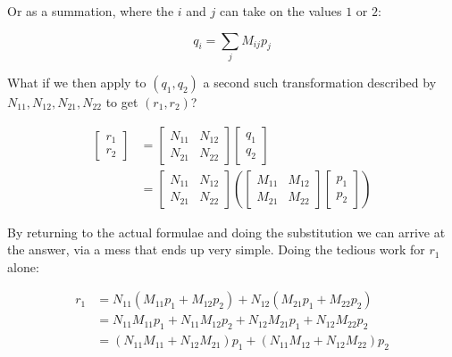 Or as a summation, where the $i$ and $j$ can take on the values $1$ or $2$:

\begin{equation}
q_i = \sum_{j} M_{ij} p_j
\label{eqn:matrix-multiplication-summation}
\end{equation}

What if we then apply to $(q_1, q_2)$ a second such transformation described by $N_{11}, N_{12}, N_{21}, N_{22}$ to get $(r_1, r_2)$? 

\begin{equation}
\begin{split}
\begin{bmatrix}
r_1 \\
r_2
\end{bmatrix}
&=
\begin{bmatrix}
N_{11} & N_{12} \\
N_{21} & N_{22}
\end{bmatrix}
\begin{bmatrix}
q_1 \\
q_2
\end{bmatrix} \\
&= 
\begin{bmatrix}
N_{11} & N_{12} \\
N_{21} & N_{22}
\end{bmatrix}
\left(
\begin{bmatrix}
M_{11} & M_{12} \\
M_{21} & M_{22}
\end{bmatrix}
\begin{bmatrix}
p_1 \\
p_2
\end{bmatrix}
\right)
\end{split}
\label{eqn:matrix-bracketing}
\end{equation}

By returning to the actual formulae and doing the substitution we can arrive at the answer, via a mess that ends up very simple. Doing the tedious work for $r_1$ alone:

\begin{equation}
\begin{split}
r_1 &= N_{11}(M_{11}p_1 + M_{12}p_2) + N_{12}(M_{21}p_1 + M_{22}p_2)  \\
    &= N_{11}M_{11}p_1 + N_{11}M_{12}p_2 + N_{12}M_{21}p_1 + N_{12}M_{22}p_2    \\
    &= (N_{11}M_{11} + N_{12}M_{21})p_1 + (N_{11}M_{12} + N_{12}M_{22})p_2    
\end{split}
\end{equation}

